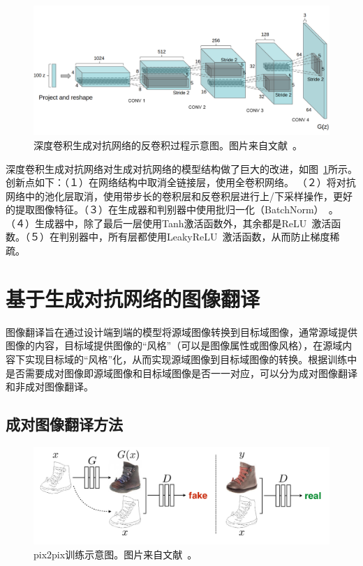 \begin{figure}[ht]
    \centering
	\includegraphics[width=\textwidth]{figures/DCGAN.png}
	\caption{深度卷积生成对抗网络的反卷积过程示意图。图片来自文献~\cite{radford2015unsupervised}。}
	\label{fig:pic_dCGAN}
\end{figure}

深度卷积生成对抗网络对生成对抗网络的模型结构做了巨大的改进，如图~\ref{fig:pic_dCGAN}所示。创新点如下：（１）在网络结构中取消全链接层，使用全卷积网络。
（２）将对抗网络中的池化层取消，使用带步长的卷积层和反卷积层进行上/下采样操作，更好的提取图像特征。（３）在生成器和判别器中使用批归一化（BatchNorm）~\cite{ioffe2015batch}。
（４）生成器中，除了最后一层使用Tanh激活函数外，其余都是ReLU~\cite{nair2010rectified}激活函数。（５）在判别器中，所有层都使用LeakyReLU~\cite{xu2015empirical}激活函数，从而防止梯度稀疏。

\section{基于生成对抗网络的图像翻译}
图像翻译旨在通过设计端到端的模型将源域图像转换到目标域图像，通常源域提供图像的内容，目标域提供图像的“风格”（可以是图像属性或图像风格），在源域内容下实现目标域的“风格”化，从而实现源域图像到目标域图像的转换。根据训练中是否需要成对图像即源域图像和目标域图像是否一一对应，可以分为成对图像翻译和非成对图像翻译。

\subsection{成对图像翻译方法}

\begin{figure}[htp]
    \centering
	\includegraphics[width=\textwidth]{figures/pix2pix.pdf}
	\caption{pix2pix训练示意图。图片来自文献~\cite{isola2017image}。}
	\label{fig:pix2pix}
\end{figure}

